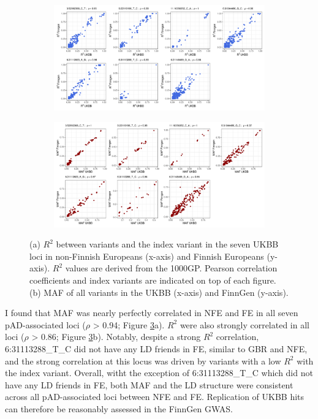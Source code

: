 \begin{figure}[H]
  \centering
  \begin{subfigure}[b]{1.0\textwidth}
      \centering
      \includegraphics[width=\textwidth]{ukbb_finngen_ld_plot}
      \caption{}
      \label{fig:ukbb_finngen_ld_plot}
  \end{subfigure}
  \hfill
  \begin{subfigure}[b]{1.0\textwidth}
      \centering
      \includegraphics[width=\textwidth]{ukbb_finngen_maf_plot}
      \caption{}
      \label{fig:ukbb_finngen_maf_plot}
  \end{subfigure}


     \caption{(a) $R^{2}$ between variants and the index variant in the seven UKBB loci in non-Finnish Europeans (x-axis) and Finnish Europeans (y-axis). $R^{2}$ values are derived from the 1000GP. Pearson correlation coefficients and index variants are indicated on top of each figure. (b) MAF of all variants in the UKBB (x-axis) and FinnGen (y-axis).}
     \label{fig:ld_maf_replication_ukbb_in_finngen}
\end{figure}
I found that MAF was nearly perfectly correlated in NFE and FE in all seven pAD-associated loci ($\rho$ > 0.94; Figure \ref{fig:ld_maf_replication_ukbb_in_finngen}a). $R^{2}$ were also strongly correlated in all loci ($\rho$ > 0.86; Figure \ref{fig:ld_maf_replication_ukbb_in_finngen}b). Notably, despite a strong $R^{2}$ correlation, 6:31113288\_T\_C did not have any LD friends in FE, similar to GBR and NFE, and the strong correlation at this locus was driven by variants with a low $R^{2}$ with the index variant. Overall, witht the exception of 6:31113288\_T\_C which did not have any LD friends in FE, both MAF and the LD structure were consistent across all pAD-associated loci between NFE and FE. Replication of UKBB hits can therefore be reasonably assessed in the FinnGen GWAS.\\

